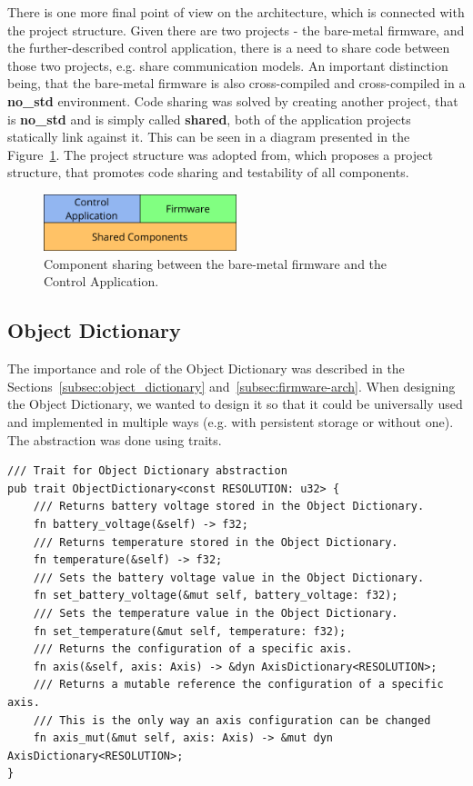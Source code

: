 There is one more final point of view on the architecture, which is connected with the project structure.
Given there are two projects - the bare-metal firmware, and the further-described control application, there is a need to share code between those two projects, e.g. share communication models.
An important distinction being, that the bare-metal firmware is also cross-compiled and cross-compiled in a \textbf{no\_std} environment.
Code sharing was solved by creating another project, that is \textbf{no\_std} and is simply called \textbf{shared}, both of the application projects statically link against it.
This can be seen in a diagram presented in the Figure~\ref{fig:component_arch}.
The project structure was adopted from\cite{aparicio_testing_nodate}, which proposes a project structure, that promotes code sharing and testability of all components.

\begin{figure}[H]
    \centering
    \includegraphics[width=0.5\textwidth]{obrazky/components}
    \caption{Component sharing between the bare-metal firmware and the Control Application.}
    \label{fig:component_arch}
\end{figure}

\subsection{Object Dictionary}
\label{subsec:object_dict_impl}
The importance and role of the Object Dictionary was described in the Sections~\ref{subsec:object_dictionary} and~\ref{subsec:firmware-arch}.
When designing the Object Dictionary, we wanted to design it so that it could be universally used and implemented in multiple ways (e.g. with persistent storage or without one).
The abstraction was done using traits.

\begin{lstlisting}[caption={Trait for abstracting away the Object Dictionary.},label=lst:od_trait]
/// Trait for Object Dictionary abstraction
pub trait ObjectDictionary<const RESOLUTION: u32> {
    /// Returns battery voltage stored in the Object Dictionary.
    fn battery_voltage(&self) -> f32;
    /// Returns temperature stored in the Object Dictionary.
    fn temperature(&self) -> f32;
    /// Sets the battery voltage value in the Object Dictionary.
    fn set_battery_voltage(&mut self, battery_voltage: f32);
    /// Sets the temperature value in the Object Dictionary.
    fn set_temperature(&mut self, temperature: f32);
    /// Returns the configuration of a specific axis.
    fn axis(&self, axis: Axis) -> &dyn AxisDictionary<RESOLUTION>;
    /// Returns a mutable reference the configuration of a specific axis.
    /// This is the only way an axis configuration can be changed
    fn axis_mut(&mut self, axis: Axis) -> &mut dyn AxisDictionary<RESOLUTION>;
}
\end{lstlisting}

